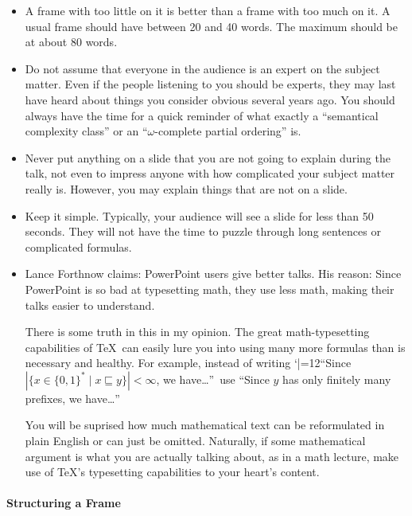 \begin{itemize}
\item
  A frame with too little on it is better than a frame with too much
  on it. A usual frame should have between 20 and 40 words. The
  maximum should be at about 80 words.
\item
  Do not assume that everyone in the audience is an expert on the
  subject matter. Even if the
  people listening to you should be experts, they may last have heard
  about things you consider obvious several years ago. You should
  always have the time for a quick reminder of what exactly a
  ``semantical complexity class'' or an ``$\omega$-complete partial
  ordering'' is.
\item
  Never put anything on a slide that you are not going to explain
  during the talk, not even to impress anyone with how
    complicated your subject matter really is. However, you may
  explain things that are not on a slide.
\item
  Keep it simple. Typically, your audience will see a slide for less
  than 50 seconds. They will not have the time to puzzle through long
  sentences or complicated formulas.
\item
  Lance Forthnow claims: PowerPoint users give better talks. His
  reason: Since PowerPoint is so bad at typesetting math, they use
  less math, making their talks easier to understand.

  There is some truth in this in my opinion. The great
  math-typesetting capabilities of \TeX\ can easily lure you into
  using many more formulas than is necessary and healthy. For example,
  instead of writing {\catcode `|=12``Since $\left|\{x \in \{0,1\}^*
  \mid x \sqsubseteq y\}\right| < \infty$}, we have\dots''\ use ``Since
  $y$ has only finitely many prefixes, we have\dots''

  You will be suprised how much mathematical text can be reformulated
  in plain English or can just be omitted. Naturally, if some
  mathematical argument is what you are actually talking about, as in
  a math lecture, make use of \TeX's typesetting capabilities to your
  heart's content. 
\end{itemize}



\paragraph{Structuring a Frame}

